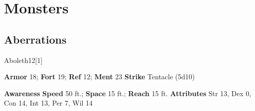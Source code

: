 \chapter{Monsters}
\section{Aberrations}
\begin{monsection}{Aboleth}{12}[1]
\vspace{-1em}\vspace{-1em}
\begin{spellcontent}
\begin{spelltargetinginfo}
\pari \textbf{Armor} 18; \textbf{Fort} 19; \textbf{Ref} 12; \textbf{Ment} 23
\pari \textbf{Strike} Tentacle  (5d10)
\end{spelltargetinginfo}
\end{spellcontent}
\begin{spellsubcontent}
\begin{spellfooter}
\pari \textbf{Awareness} 
\pari \textbf{Speed} 50 ft.; \textbf{Space} 15 ft.; \textbf{Reach} 15 ft.
\pari \textbf{Attributes} Str 13, Dex 0, Con 14, Int 13, Per 7, Wil 14
\end{spellfooter}
\end{spellsubcontent}
\end{monsection}
